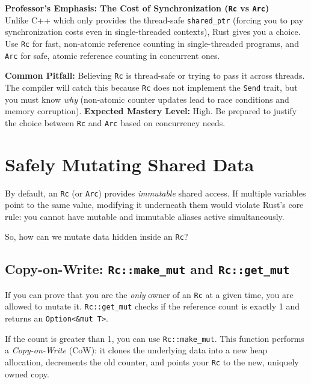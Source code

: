 \begin{examprioritybox}
\textbf{Professor's Emphasis: The Cost of Synchronization (\texttt{Rc} vs \texttt{Arc})} \\
Unlike C++ which only provides the thread-safe \texttt{shared\_ptr} (forcing you to pay synchronization costs even in single-threaded contexts), Rust gives you a choice. Use \texttt{Rc} for fast, non-atomic reference counting in single-threaded programs, and \texttt{Arc} for safe, atomic reference counting in concurrent ones.

\textbf{Common Pitfall:} Believing \texttt{Rc} is thread-safe or trying to pass it across threads. The compiler will catch this because \texttt{Rc} does not implement the \texttt{Send} trait, but you must know \textit{why} (non-atomic counter updates lead to race conditions and memory corruption).
\textbf{Expected Mastery Level:} High. Be prepared to justify the choice between \texttt{Rc} and \texttt{Arc} based on concurrency needs.
\end{examprioritybox}

\section{Safely Mutating Shared Data}

By default, an \texttt{Rc} (or \texttt{Arc}) provides \textit{immutable} shared access. If multiple variables point to the same value, modifying it underneath them would violate Rust's core rule: you cannot have mutable and immutable aliases active simultaneously. 

So, how can we mutate data hidden inside an \texttt{Rc}?

\subsection*{Copy-on-Write: \texttt{Rc::make\_mut} and \texttt{Rc::get\_mut}}
If you can prove that you are the \textit{only} owner of an \texttt{Rc} at a given time, you are allowed to mutate it. \texttt{Rc::get\_mut} checks if the reference count is exactly 1 and returns an \texttt{Option<\&mut T>}.

If the count is greater than 1, you can use \texttt{Rc::make\_mut}. This function performs a \textit{Copy-on-Write} (CoW): it clones the underlying data into a new heap allocation, decrements the old counter, and points your \texttt{Rc} to the new, uniquely owned copy.

